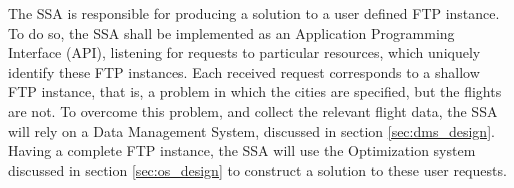 The SSA is responsible for producing a solution to a user defined FTP instance. To do so, the SSA shall be implemented as an Application Programming Interface (API), listening for requests to particular resources, which uniquely identify these FTP instances. Each received request corresponds to a shallow FTP instance, that is, a problem in which the cities are specified, but the flights are not. To overcome this problem, and collect the relevant flight data, the SSA will rely on a Data Management System, discussed in section \ref{sec:dms_design}. Having a complete FTP instance, the SSA will use the Optimization system discussed in section \ref{sec:os_design} to construct a solution to these user requests.


